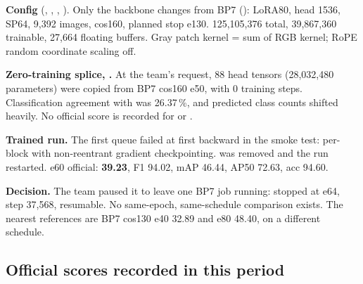 \textbf{Config} (, , , ). Only the backbone changes from BP7 (): LoRA80, head 1536, SP64, 9,392 images, cos160, planned stop e130. 125,105,376 total, 39,867,360 trainable, 27,664 floating buffers. Gray patch kernel = sum of RGB kernel; RoPE random coordinate scaling off.

\textbf{Zero-training splice, .} At the team's request, 88 head tensors (28,032,480 parameters) were copied from BP7 cos160 e50, with 0 training steps. Classification agreement with  was 26.37\,\%, and predicted class counts shifted heavily. No official score is recorded for  or .

\textbf{Trained run.} The first queue failed at first backward in the smoke test: per-block  with non-reentrant gradient checkpointing.  was removed and the run restarted. e60 official: \textbf{39.23}, F1 94.02, mAP 46.44, AP50 72.63, acc 94.60.

\textbf{Decision.} The team paused it to leave one BP7 job running: stopped at e64, step 37,568, resumable. No same-epoch, same-schedule comparison exists. The nearest references are BP7 cos130 e40 32.89 and e80 48.40, on a different schedule.

\subsection{Official scores recorded in this period}

